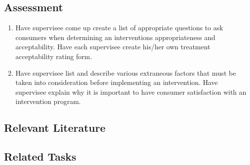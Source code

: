 \subsection{Assessment}
\begin{enumerate}
\item Have supervisee come up create a list of appropriate questions to ask consumers when determining an interventions appropriateness and acceptability. Have each supervisee create his/her own treatment acceptability rating form.
\item Have supervisee list and describe various extraneous factors that must be taken into consideration before implementing an intervention. Have supervisee explain why it is important to have consumer satisfaction with an intervention program.
\end{enumerate}
%
\subsection{Relevant Literature}
\begin{refsection}
\nocite{test,alang2017police,clayton2018black}
\printbibliography[heading=none]
\end{refsection}
%
\subsection{Related Tasks}
\fourcOne{}\\
\fourgSix{}\\
\fourgEight{}\\
\fouriOne{}\\
\fouriTwo{}\\
\fourjSix{}\\
\fourjEight{}\\
\fourkSeven{}\\
\fourkNine{}\\
\fourFKEleven{}\\
%
%
%
%
%
%
%
%
%
%
%
